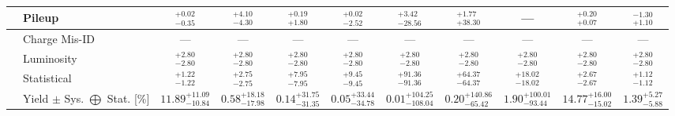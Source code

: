 \begin{tabular}{|cl||ccccccc|c||c|}
&Pileup &  $^{+0.02}_{-0.35}$  &  $^{+4.10}_{-4.30}$  &  $^{+0.19}_{+1.80}$  &  $^{+0.02}_{-2.52}$  &  $^{+3.42}_{-28.56}$  &  $^{+1.77}_{+38.30}$  & --- &  $^{+0.20}_{+0.07}$  &  $^{-1.30}_{+1.10}$ \\ 
\hline
&Charge Mis-ID & --- & --- & --- & --- & --- & --- & --- & --- & ---\\ 
\hline
&Luminosity &  $^{+2.80}_{-2.80}$  &  $^{+2.80}_{-2.80}$  &  $^{+2.80}_{-2.80}$  &  $^{+2.80}_{-2.80}$  &  $^{+2.80}_{-2.80}$  &  $^{+2.80}_{-2.80}$  &  $^{+2.80}_{-2.80}$  &  $^{+2.80}_{-2.80}$  &  $^{+2.80}_{-2.80}$ \\ 
\hline
&Statistical &  $^{+1.22}_{-1.22}$  &  $^{+2.75}_{-2.75}$  &  $^{+7.95}_{-7.95}$  &  $^{+9.45}_{-9.45}$  &  $^{+91.36}_{-91.36}$  &  $^{+64.37}_{-64.37}$  &  $^{+18.02}_{-18.02}$  &  $^{+2.67}_{-2.67}$  &  $^{+1.12}_{-1.12}$ \\ 
\hline
\hline
&Yield $\pm$ Sys. $\bigoplus$ Stat. [\%] &  $11.89^{+11.09}_{-10.84}$  &  $0.58^{+18.18}_{-17.98}$  &  $0.14^{+31.75}_{-31.35}$  &  $0.05^{+33.44}_{-34.78}$  &  $0.01^{+104.25}_{-108.04}$  &  $0.20^{+140.86}_{-65.42}$  &  $1.90^{+100.01}_{-93.44}$  &  $14.77^{+16.00}_{-15.02}$  &  $1.39^{+5.27}_{-5.88}$ \\ 
\hline
\end{tabular}
